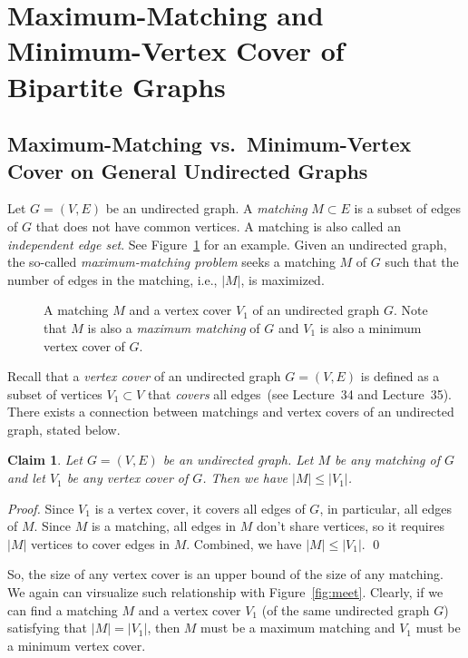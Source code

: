 \documentclass[letterpaper,11pt]{article}
\theoremstyle{mytheorem}
\newtheorem{claim}{Claim}
\begin{document}
\section*{Maximum-Matching and Minimum-Vertex Cover of Bipartite Graphs}

\subsection*{Maximum-Matching vs.\ Minimum-Vertex Cover on General Undirected Graphs}

Let $G = (V, E)$ be an undirected graph. A \emph{matching} $M \subset E$ 
is a subset of edges of $G$ that does not have common vertices.
A matching is also called an \emph{independent edge set}.
See Figure~\ref{fig:matching} for an example.
Given an undirected graph, the so-called \emph{maximum-matching problem}
seeks a matching $M$ of $G$ such that the number of edges in the matching, i.e., $|M|$, 
is maximized.

\begin{figure}[h]
\centering{}
\caption{A matching $M$ and a vertex cover $V_1$ of an undirected graph $G$. 
Note that $M$ is also a \emph{maximum matching} of $G$ and $V_1$ is also a minimum vertex cover of $G$.}
\label{fig:matching}
\end{figure}

Recall that a \emph{vertex cover} of an undirected graph $G = (V, E)$ is defined
as a subset of vertices $V_1\subset V$ that \emph{covers} all edges~(see Lecture~34 and Lecture~35).
There exists a connection between matchings and vertex covers of an undirected graph, stated below.

\begin{claim}
Let $G = (V, E)$ be an undirected graph. Let $M$ be any matching of $G$ and let $V_1$ be any vertex cover of $G$.
Then we have $|M| \le |V_1|$.
\end{claim}

\emph{Proof.} Since $V_1$ is a vertex cover, it covers all edges of $G$, in particular, all edges of $M$.
Since $M$ is a matching, all edges in $M$ don't share vertices, so it requires $|M|$ vertices to cover edges in $M$.
Combined, we have $|M| \le |V_1|$. \qed

So, the size of any vertex cover is an upper bound of the size of any matching. We again can virsualize
such relationship with Figure~\ref{fig:meet}. Clearly, if we can find a matching $M$ and a vertex cover $V_1$
(of the same undirected graph $G$) satisfying that $|M| = |V_1|$, then $M$ must be a maximum matching 
and $V_1$ must be a minimum vertex cover.
\end{document}
